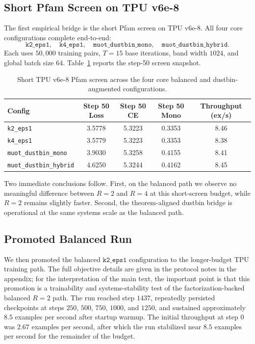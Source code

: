 \documentclass{article}
\begin{document}
\subsection{Short Pfam Screen on TPU v6e-8}

The first empirical bridge is the short Pfam screen on TPU v6e-8. All four core configurations complete end-to-end:
\[
\texttt{k2\_eps1},\quad
\texttt{k4\_eps1},\quad
\texttt{muot\_dustbin\_mono},\quad
\texttt{muot\_dustbin\_hybrid}.
\]
Each uses $50{,}000$ training pairs, $T=15$ base iterations, band width $1024$, and global batch size $64$. Table~\ref{tab:screen_unified} reports the step-50 screen snapshot.

\begin{table}[h]
    \centering
    \begin{tabular}{@{}lcccc@{}}
        \toprule
        Config & Step 50 Loss & Step 50 CE & Step 50 Mono & Throughput (ex/s) \\
        \midrule
        \texttt{k2\_eps1} & 3.5778 & 5.3223 & 0.3353 & 8.46 \\
        \texttt{k4\_eps1} & 3.5779 & 5.3223 & 0.3353 & 8.38 \\
        \texttt{muot\_dustbin\_mono} & 3.9030 & 5.3258 & 0.4155 & 8.41 \\
        \texttt{muot\_dustbin\_hybrid} & 4.6250 & 5.3244 & 0.4162 & 8.45 \\
        \bottomrule
    \end{tabular}
    \caption{Short TPU v6e-8 Pfam screen across the four core balanced and dustbin-augmented configurations.}
    \label{tab:screen_unified}
\end{table}

Two immediate conclusions follow. First, on the balanced path we observe no meaningful difference between $R=2$ and $R=4$ at this short-screen budget, while $R=2$ remains slightly faster. Second, the theorem-aligned dustbin bridge is operational at the same systems scale as the balanced path.

\subsection{Promoted Balanced Run}

We then promoted the balanced $\texttt{k2\_eps1}$ configuration to the longer-budget TPU training path. The full objective details are given in the protocol notes in the appendix; for the interpretation of the main text, the important point is that this promotion is a trainability and systems-stability test of the factorization-backed balanced $R=2$ path. The run reached step $1437$, repeatedly persisted checkpoints at steps $250$, $500$, $750$, $1000$, and $1250$, and sustained approximately $8.5$ examples per second after startup warmup. The initial throughput at step $0$ was $2.67$ examples per second, after which the run stabilized near $8.5$ examples per second for the remainder of the budget.
\end{document}
